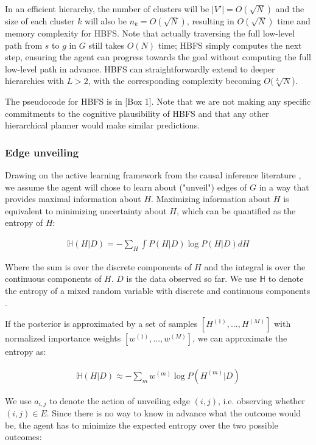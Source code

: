 \documentclass[11pt]{article}
\begin{document}
In an efficient hierarchy, the number of clusters will be $|V'| = O(\sqrt{N})$ and the size of each cluster $k$ will also be $n_k = O(\sqrt{N})$, resulting in $O(\sqrt{N})$ time and memory complexity for HBFS. Note that actually traversing the full low-level path from $s$ to $g$ in $G$ still takes $O(N)$ time; HBFS simply computes the next step, ensuring the agent can progress towards the goal without computing the full low-level path in advance. HBFS can straightforwardly extend to deeper hierarchies with $L > 2$, with the corresponding complexity becoming $O(\sqrt[L]{N}$).

The pseudocode for HBFS is in [Box 1]. Note that we are not making any specific commitments to the cognitive plausibility of HBFS and that any other hierarchical planner would make similar predictions.

\subsubsection{Edge unveiling}

Drawing on the active learning framework from the causal inference literature \cite{murphy2001active, tong2001active}, we assume the agent will chose to learn about ("unveil") edges of $G$ in a way that provides maximal information about $H$. Maximizing information about $H$ is equivalent to minimizing uncertainty about $H$, which can be quantified as the entropy of $H$:

\begin{align}
    \mathbb{H}(H|D) = - \sum_H \int P(H|D) \log P(H|D) dH
\end{align}

Where the sum is over the discrete components of $H$ and the integral is over the continuous components of $H$. $D$ is the data observed so far. We use $\mathbb{H}$ to denote the entropy of a mixed random variable with discrete and continuous components \cite{nair2006entropy}. 

If the posterior is approximated by a set of samples $[H^{(1)}, ..., H^{(M)}]$ with normalized importance weights $[w^{(1)}, ..., w^{(M)}]$, we can approximate the entropy as:

\begin{align} 
    \mathbb{H}(H|D) \approx - \sum_m w^{(m)} \log P(H^{(m)}|D)
\end{align}

We use $a_{i,j}$ to denote the action of unveiling edge $(i,j)$, i.e. observing whether $(i,j) \in E$. Since there is no way to know in advance what the outcome would be, the agent has to minimize the expected entropy over the two possible outcomes:
\end{document}
